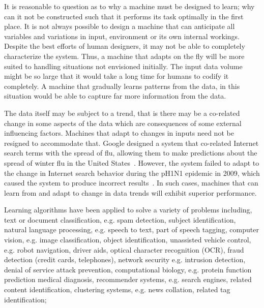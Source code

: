 It is reasonable to question as to why a machine must be designed to learn; why can it not be constructed such that it performs its task optimally in the first place. It is not always possible to design a machine that can anticipate all variables and variations in input, environment or its own internal workings. Despite the best efforts of human designers, it may not be able to completely characterize the system. Thus, a machine that adapts on the fly will be more suited to handling situations not envisioned initially. The input data volume might be so large that it would take a long time for humans to codify it completely. A machine that gradually learns patterns from the data, in this situation would be able to capture far more information from the data.

The data itself may be subject to a trend, that is there may be a co-related change in some aspects of the data which are consequences of some external influencing factors. Machines that adapt to changes in inputs need not be resigned to accommodate that. Google designed a system that co-related Internet search terms with the spread of flu, allowing them to make predictions about the spread of winter flu in the United States~\cite{ginsberg2008detecting}. However, the system failed to adapt to the change in Internet search behavior during the pH1N1 epidemic in 2009, which caused the system to produce incorrect results~\cite{10.1371/journal.pone.0023610}. In such cases, machines that can learn from and adapt to change in data trends will exhibit superior performance. 




Learning algorithms have been applied to solve a variety of problems including, text or document classification, e.g. spam detection, subject identification, natural language processing, e.g. speech to text, part of speech tagging, computer vision, e.g. image classification, object identification, unassisted vehicle control, e.g. robot navigation, driver aids, optical character recognition (OCR), fraud detection (credit cards, telephones), network security e.g. intrusion detection, denial of service attack prevention, computational biology, e.g. protein function prediction medical diagnosis, recommender systems, e.g. search engines, related content identification, clustering systems, e.g. news collation, related tag identification;




